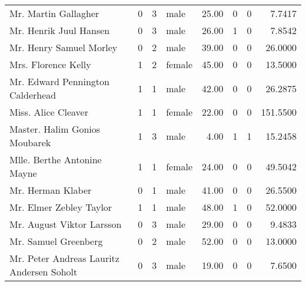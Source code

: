 \begin{tabular}{lrrlrrrr}
Mr. Martin Gallagher                               &         0 &       3 &    male &  25.00 &                        0 &                        0 &    7.7417 \\
Mr. Henrik Juul Hansen                             &         0 &       3 &    male &  26.00 &                        1 &                        0 &    7.8542 \\
Mr. Henry Samuel Morley                            &         0 &       2 &    male &  39.00 &                        0 &                        0 &   26.0000 \\
Mrs. Florence Kelly                                &         1 &       2 &  female &  45.00 &                        0 &                        0 &   13.5000 \\
Mr. Edward Pennington Calderhead                   &         1 &       1 &    male &  42.00 &                        0 &                        0 &   26.2875 \\
Miss. Alice Cleaver                                &         1 &       1 &  female &  22.00 &                        0 &                        0 &  151.5500 \\
Master. Halim Gonios Moubarek                      &         1 &       3 &    male &   4.00 &                        1 &                        1 &   15.2458 \\
Mlle. Berthe Antonine Mayne                        &         1 &       1 &  female &  24.00 &                        0 &                        0 &   49.5042 \\
Mr. Herman Klaber                                  &         0 &       1 &    male &  41.00 &                        0 &                        0 &   26.5500 \\
Mr. Elmer Zebley Taylor                            &         1 &       1 &    male &  48.00 &                        1 &                        0 &   52.0000 \\
Mr. August Viktor Larsson                          &         0 &       3 &    male &  29.00 &                        0 &                        0 &    9.4833 \\
Mr. Samuel Greenberg                               &         0 &       2 &    male &  52.00 &                        0 &                        0 &   13.0000 \\
Mr. Peter Andreas Lauritz Andersen Soholt          &         0 &       3 &    male &  19.00 &                        0 &                        0 &    7.6500 \\

\end{tabular}
